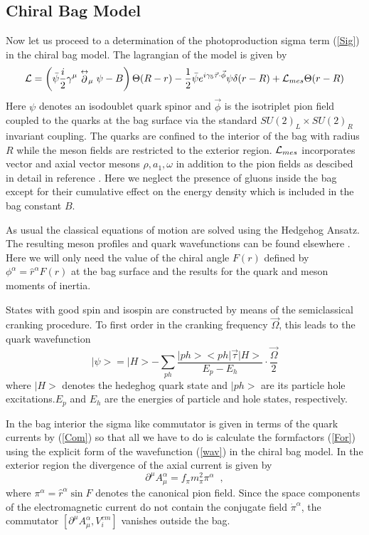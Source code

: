 \subsection{Chiral Bag Model}
Now let us proceed to a determination of the photoproduction sigma
term (\ref{Sig}) in the chiral bag model. The lagrangian of the model is given
by
\begin {equation}
\label{LCB}
{\cal L}= \left( \bar{\psi}\frac{i}{2}\gamma^{\mu}\stackrel{\leftrightarrow}
{\partial}_{\mu}\psi -B\right) \Theta (R-r) - \frac{1}{2} \bar{\psi}
e^{i\gamma_5 \vec{\tau}\cdot\vec{\phi}}\psi\delta (r-R)
+{\cal L}_{mes}\Theta (r-R)
\end{equation}
Here $\psi$ denotes an isodoublet quark spinor and $\vec{\phi}$ is the
isotriplet  pion field coupled to the quarks at the bag surface 
via the standard $SU(2)_L \times SU(2)_R$ invariant
coupling. The quarks are confined to the interior of the bag with
radius $R$ while the meson
fields are restricted to the exterior region. ${\cal L}_{mes}$
incorporates vector and axial vector mesons
$\rho,a_1,\omega$ in addition to the pion
fields as descibed in detail in reference \cite{Hos}. Here we neglect
the presence of gluons inside the bag except for their cumulative 
effect on the energy density which is included in the bag constant
$B$.

As usual the classical equations of motion are solved using  the Hedgehog
Ansatz.  The resulting meson profiles and quark wavefunctions can be 
found elsewhere \cite{Hos}. Here we will only need the value of the 
chiral angle $F(r)$ defined by $\phi^{\alpha}=\hat{r}^{\alpha}F(r)$  
at the bag surface and the results for the quark and meson moments of inertia.

States with good spin and isospin are constructed by means of the 
semiclassical cranking procedure. To first order in the cranking
frequency $\vec{\Omega}$, this leads to the quark wavefunction
\begin{equation}
\label{wav}
|\psi>=|H>-\sum_{ph}\frac{|ph><ph|\vec{\tau}|H>}{E_p -E_h}
\cdot \frac{\vec{\Omega}}{2}
\end{equation}
where $|H>$ denotes the hedeghog quark state and $|ph>$ are its 
particle hole excitations.$E_p$ and $E_h$ are the energies of 
particle and hole states, respectively. 

In the bag interior the sigma like commutator is given in terms of 
the quark currents by
(\ref{Com}) so that all we have to do is calculate the formfactors
(\ref{For}) using the explicit form of the wavefunction  (\ref{wav})
in the chiral bag model. In the exterior region the divergence of 
the axial current is given by
\begin{equation}
\label{PCAC}
\partial^{\mu}A_{\mu}^{\alpha}=f_{\pi}m_{\pi}^{2}\pi^{\alpha} \;\; , 
\end{equation}
where $\pi^{\alpha}=\hat{r}^{\alpha}\sin F$ denotes the canonical pion field.
Since the space components of the electromagnetic current do not contain the
 conjugate field
$\dot{\pi}^{\alpha}$, the commutator $[\partial^{\mu}A_{\mu}^{\alpha},
V_{i}^{em}]$ vanishes outside the bag. 

